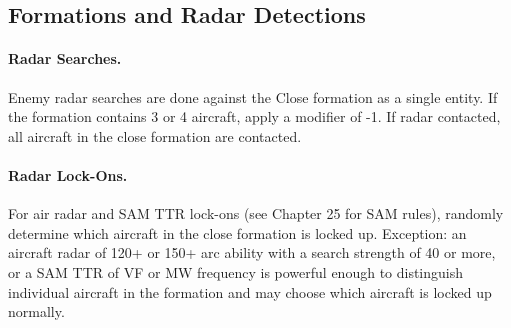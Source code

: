 \begin{advancedrules}
\section{Formations and Radar Detections}

\paragraph{Radar Searches.} Enemy radar searches are done against the Close formation as a single entity. If the formation contains 3 or 4 aircraft, apply a modifier of -1. If radar contacted, all aircraft in the close formation are contacted.

\paragraph{Radar Lock-Ons.} For air radar and SAM TTR lock-ons (see Chapter 25 for SAM rules), randomly determine which aircraft in the close formation is locked up. Exception: an aircraft radar of 120+ or 150+ arc ability with a search strength of 40 or more, or a SAM TTR of VF or MW frequency is powerful enough to distinguish individual aircraft in the formation and may choose which aircraft is locked up normally.

\end{advancedrules}
